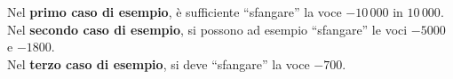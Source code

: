 

\Examples
\begin{example}
%
%
%
\end{example}


\Explanation
Nel \textbf{primo caso di esempio}, è sufficiente ``sfangare'' la voce $-10\,000$ in $10\,000$.\\[2mm]
Nel \textbf{secondo caso di esempio}, si possono ad esempio ``sfangare'' le voci $-5000$ e $-1800$.\\[2mm]
Nel \textbf{terzo caso di esempio}, si deve ``sfangare'' la voce $-700$.
